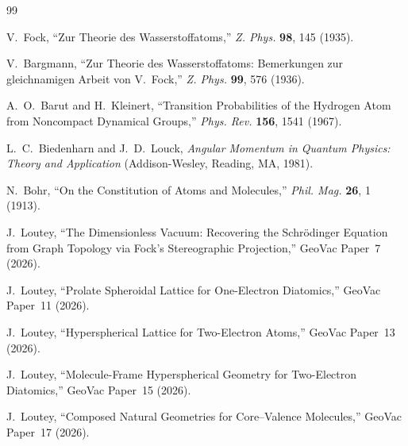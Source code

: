 \documentclass[aps,prl,reprint,amsmath,amssymb]{revtex4-2}
\begin{document}
\begin{thebibliography}{99}

V.~Fock,
``Zur Theorie des Wasserstoffatoms,''
\textit{Z. Phys.} \textbf{98}, 145 (1935).

V.~Bargmann,
``Zur Theorie des Wasserstoffatoms: Bemerkungen zur gleichnamigen
Arbeit von V.~Fock,''
\textit{Z. Phys.} \textbf{99}, 576 (1936).

A.~O.~Barut and H.~Kleinert,
``Transition Probabilities of the Hydrogen Atom from Noncompact
Dynamical Groups,''
\textit{Phys. Rev.} \textbf{156}, 1541 (1967).

L.~C.~Biedenharn and J.~D.~Louck,
\textit{Angular Momentum in Quantum Physics: Theory and Application}
(Addison-Wesley, Reading, MA, 1981).

N.~Bohr,
``On the Constitution of Atoms and Molecules,''
\textit{Phil. Mag.} \textbf{26}, 1 (1913).

J.~Loutey,
``The Dimensionless Vacuum: Recovering the Schr\"odinger Equation
from Graph Topology via Fock's Stereographic Projection,''
GeoVac Paper~7 (2026).

J.~Loutey,
``Prolate Spheroidal Lattice for One-Electron Diatomics,''
GeoVac Paper~11 (2026).

J.~Loutey,
``Hyperspherical Lattice for Two-Electron Atoms,''
GeoVac Paper~13 (2026).

J.~Loutey,
``Molecule-Frame Hyperspherical Geometry for Two-Electron Diatomics,''
GeoVac Paper~15 (2026).

J.~Loutey,
``Composed Natural Geometries for Core--Valence Molecules,''
GeoVac Paper~17 (2026).

\end{thebibliography}
\end{document}
